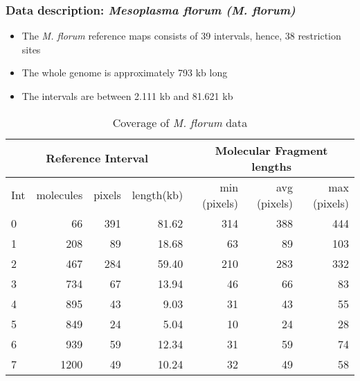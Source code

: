 \documentclass[10pt,dvipsnames,table]{beamer}
\begin{document}
\begin{frame}
\frametitle{Data description: {\emph{Mesoplasma florum (M. florum)}}}
\begin{itemize}
\item The {\emph{M. florum}} reference maps consists of 39 intervals, hence, 38 restriction sites 
\item The whole genome is approximately 793 kb long 
\item The intervals are between 2.111 kb and 81.621 kb 
\end{itemize}

\begin{table}[h]
\footnotesize
\centering
\begin{tabular}{lrrr|rrr}
  \hline
  \hline
  \multicolumn{4}{c}{Reference Interval} & \multicolumn{3}{c}{Molecular Fragment lengths} \\
  \hline
   Int  & molecules & pixels & length(kb) & min (pixels) & avg (pixels) & max (pixels)\\ 
  \hline
  \hline
  0 & 66 & 391 & 81.62 & 314 & 388 & 444 \\ 
  1 & 208 & 89 & 18.68 & 63 & 89 & 103 \\ 
  2 & 467 & 284 & 59.40 & 210 & 283 & 332 \\ 
  3 & 734 & 67 & 13.94 & 46 & 66 & 83 \\ 
  4 & 895 & 43 & 9.03 & 31 & 43 & 55 \\ 
  5 & 849 & 24 & 5.04 & 10 & 24 & 28 \\ 
  6 & 939 & 59 & 12.34 & 31 & 59 & 74 \\ 
  7 & 1200 & 49 & 10.24 & 32 & 49 & 58 \\ 
  \hline
\end{tabular}
\caption{Coverage of {\emph{M. florum}} data}
\end{table}
\end{frame}
\end{document}
